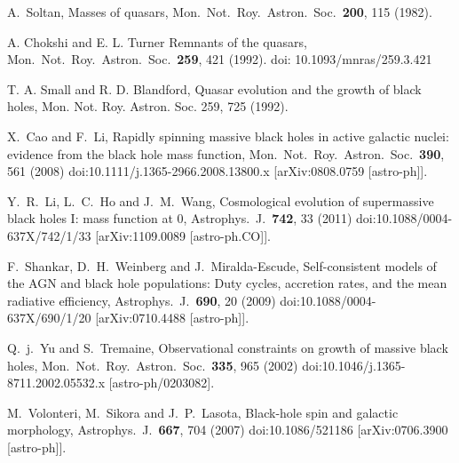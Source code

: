\documentclass[aps,prd,twocolumn,superscriptaddress,tightenlines,nofootinbib]{revtex4-1}
\begin{document}
\begin{thebibliography}{99}
  A.~Soltan,
 {\color{rossoCP3}  Masses of quasars},
  Mon.\ Not.\ Roy.\ Astron.\ Soc.\  {\bf 200}, 115 (1982).



A. Chokshi and E. L. Turner
{\color{rossoCP3} Remnants of the quasars},
 Mon.\ Not.\ Roy.\ Astron.\ Soc.\  {\bf 259}, 421 (1992).
doi: 10.1093/mnras/259.3.421


T. A. Small and R. D. Blandford, 
{\color{rossoCP3}  Quasar evolution and the growth of black holes},
Mon. Not. Roy. Astron. Soc. 259, 725 (1992).



  X.~Cao and F.~Li,
  {\color{rossoCP3}  Rapidly spinning massive black holes in active galactic nuclei: evidence from the black hole mass function},
  Mon.\ Not.\ Roy.\ Astron.\ Soc.\  {\bf 390}, 561 (2008)
  doi:10.1111/j.1365-2966.2008.13800.x
  [arXiv:0808.0759 [astro-ph]].


  Y.~R.~Li, L.~C.~Ho and J.~M.~Wang,
   {\color{rossoCP3} Cosmological evolution of supermassive black
     holes 
I: mass function at 0},  
Astrophys.\ J.\  {\bf 742}, 33 (2011)
  doi:10.1088/0004-637X/742/1/33
  [arXiv:1109.0089 [astro-ph.CO]].




  F.~Shankar, D.~H.~Weinberg and J.~Miralda-Escude,
  {\color{rossoCP3}  Self-consistent models of the AGN and black hole populations: Duty cycles, accretion rates, and the mean radiative efficiency},
  Astrophys.\ J.\  {\bf 690}, 20 (2009)
  doi:10.1088/0004-637X/690/1/20
  [arXiv:0710.4488 [astro-ph]].

  Q.~j.~Yu and S.~Tremaine,
 {\color{rossoCP3}   Observational constraints on growth of massive black holes},
  Mon.\ Not.\ Roy.\ Astron.\ Soc.\  {\bf 335}, 965 (2002)
  doi:10.1046/j.1365-8711.2002.05532.x
  [astro-ph/0203082].



  M.~Volonteri, M.~Sikora and J.~P.~Lasota,
   {\color{rossoCP3} Black-hole spin and galactic morphology},
  Astrophys.\ J.\  {\bf 667}, 704 (2007)
  doi:10.1086/521186
  [arXiv:0706.3900 [astro-ph]].



\end{thebibliography}
\end{document}
